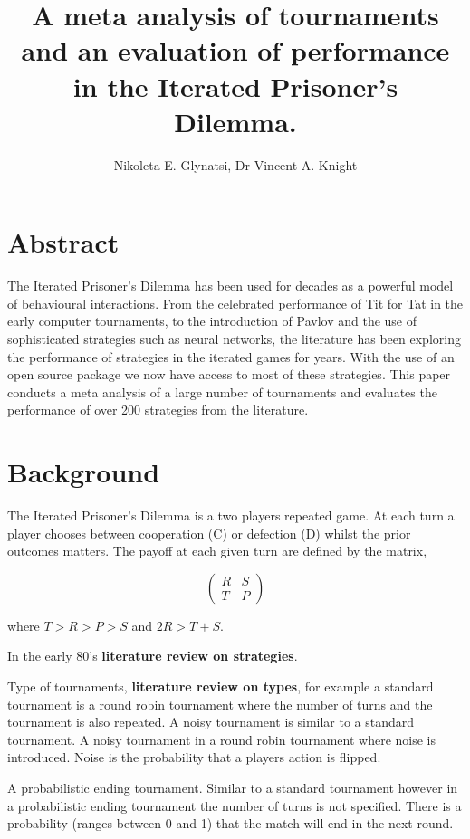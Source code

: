 \documentclass{article}
\title{A meta analysis of tournaments and an evaluation of performance in the
Iterated Prisoner's Dilemma.}
\author{Nikoleta E. Glynatsi, Dr Vincent A. Knight}
\date{}
\begin{document}
\maketitle

\section{Abstract}

The Iterated Prisoner's Dilemma has been used for decades as a powerful model of
behavioural interactions. From the celebrated performance of Tit for Tat in the
early computer tournaments, to the introduction of Pavlov and the use of
sophisticated strategies such as neural networks, the literature has been
exploring the performance of strategies in the iterated games for years. With
the use of an open source package we now have access to most of these
strategies. This paper conducts a meta analysis of a large number of tournaments
and evaluates the performance of over 200 strategies from the literature.

\section{Background}

The Iterated Prisoner's Dilemma is a two players repeated game. At each turn a
player chooses between cooperation (C) or defection (D) whilst the prior outcomes
matters. The payoff at each given turn are defined by the matrix,

\[\begin{pmatrix}
R & S \\
T & P
\end{pmatrix}\]

where \(T > R > P > S\) and \(2R > T + S\).

In the early 80's \textbf{literature review on strategies}.

Type of tournaments, \textbf{literature review on types}, for example a standard
tournament is a round robin tournament where the number of turns and the tournament
is also repeated. A noisy tournament is similar to a standard tournament. A noisy
tournament in a round robin tournament where noise is introduced. Noise is the
probability that a players action is flipped.

A probabilistic ending tournament. Similar to a standard tournament
however in a probabilistic ending tournament the number of turns is not specified.
There is a probability (ranges between 0 and 1) that the match will end in
the next round.
\end{document}
